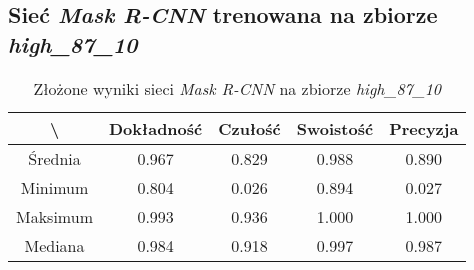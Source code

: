\subsection{Sieć \textit{Mask R-CNN} trenowana na zbiorze \textit{high\_87\_10}}

\begin{table}[H]
	\centering
	\caption{Złożone wyniki sieci \textit{Mask R-CNN} na zbiorze \textit{high\_87\_10}}
	\vspace{6pt}
	{\footnotesize
		\begin{tabular}{|c|c|c|c|c|}
      \hline \textbackslash & Dokładność & Czułość & Swoistość & Precyzja \\
      \hline Średnia & 0.967 & 0.829 & 0.988 & 0.890 \\
      \hline Minimum & 0.804 & 0.026 & 0.894 & 0.027 \\
      \hline Maksimum & 0.993 & 0.936 & 1.000 & 1.000 \\
      \hline Mediana & 0.984 & 0.918 & 0.997 & 0.987 \\
      \hline
		\end{tabular}
	}
  \vspace{0pt}
  \label{Tab:high_original_calculated}
\end{table}

